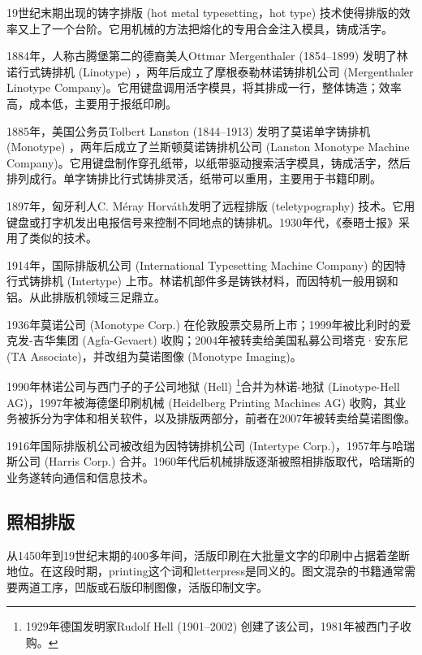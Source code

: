 19世纪末期出现的铸字排版 (hot metal typesetting，hot type) 技术使得排版的效率又上了一个台阶。它用机械的方法把熔化的专用合金注入模具，铸成活字。

1884年，人称古腾堡第二的德裔美人Ottmar Mergenthaler (1854--1899)\indexMergenthaler{} 发明了林诺行式铸排机 (Linotype) ，两年后成立了摩根泰勒林诺铸排机公司 (Mergenthaler Linotype Company)\indexLinotype{}。它用键盘调用活字模具，将其排成一行，整体铸造；效率高，成本低，主要用于报纸印刷。

1885年，美国公务员Tolbert Lanston (1844--1913)\indexLanston{} 发明了莫诺单字铸排机 (Monotype) ，两年后成立了兰斯顿莫诺铸排机公司 (Lanston Monotype Machine Company)\indexMonotypeLanston{}。它用键盘制作穿孔纸带，以纸带驱动搜索活字模具，铸成活字，然后排列成行。单字铸排比行式铸排灵活，纸带可以重用，主要用于书籍印刷。

1897年，匈牙利人C. Méray Horváth\indexMerayHorvath{}发明了远程排版 (teletypography) 技术。它用键盘或打字机发出电报信号来控制不同地点的铸排机。1930年代，《泰晤士报》采用了类似的技术。

1914年，国际排版机公司 (International Typesetting Machine Company)\indexInternationaltype{} 的因特行式铸排机 (Intertype) 上市。林诺机部件多是铸铁材料，而因特机一般用钢和铝。从此排版机领域三足鼎立。

1936年莫诺公司 (Monotype Corp.)\indexMonotype{} 在伦敦股票交易所上市；1999年被比利时的爱克发-吉华集团 (Agfa-Gevaert) 收购；2004年被转卖给美国私募公司塔克·安东尼 (TA Associate)，并改组为莫诺图像 (Monotype Imaging)\indexMonotypeImaging 。

1990年林诺公司与西门子\indexSiemens{}的子公司地狱 (Hell) \footnote{1929年德国发明家Rudolf Hell (1901--2002) 创建了该公司，1981年被西门子收购。}合并为林诺-地狱 (Linotype-Hell AG)，1997年被海德堡印刷机械 (Heidelberg Printing Machines AG) 收购，其业务被拆分为字体和相关软件，以及排版两部分，前者在2007年被转卖给莫诺图像。

1916年国际排版机公司被改组为因特铸排机公司 (Intertype Corp.)\indexIntertype{}，1957年与哈瑞斯公司 (Harris Corp.) 合并。1960年代后机械排版逐渐被照相排版取代，哈瑞斯的业务遂转向通信和信息技术。

\subsection{照相排版}

从1450年到19世纪末期的400多年间，活版印刷在大批量文字的印刷中占据着垄断地位。在这段时期，printing这个词和letterpress是同义的。图文混杂的书籍通常需要两道工序，凹版或石版印制图像，活版印制文字。

